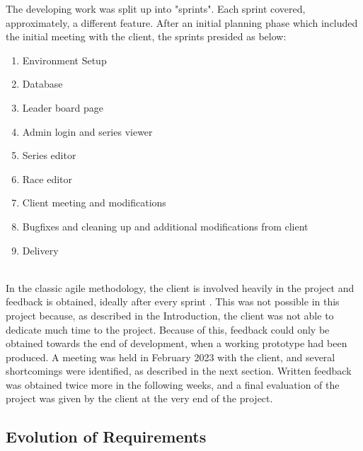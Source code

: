 \documentclass{l4proj}
\begin{document}
The developing work was split up into "sprints". Each sprint covered, approximately, a different feature. After an initial planning phase which included the initial meeting with the client, the sprints presided as below: 
\begin{enumerate}
    \item
    Environment Setup
    \item
    Database
    \item
    Leader board page
    \item
    Admin login and series viewer
    \item
    Series editor
    \item
    Race editor
    \item
    Client meeting and modifications
    \item
    Bugfixes and cleaning up and additional modifications from client
    \item
    Delivery
\end{enumerate}
\hfill\\
In the classic agile methodology, the client is involved heavily in the project and feedback is obtained, ideally after every sprint \citep{agile}. This was not possible in this project because, as described in the Introduction, the client was not able to dedicate much time to the project. Because of this, feedback could only be obtained towards the end of development, when a working prototype had been produced. A meeting was held in February 2023 with the client, and several shortcomings were identified, as described in the next section. Written feedback was obtained twice more in the following weeks, and a final evaluation of the project was given by the client at the very end of the project. 

\subsection{Evolution of Requirements}
\end{document}
